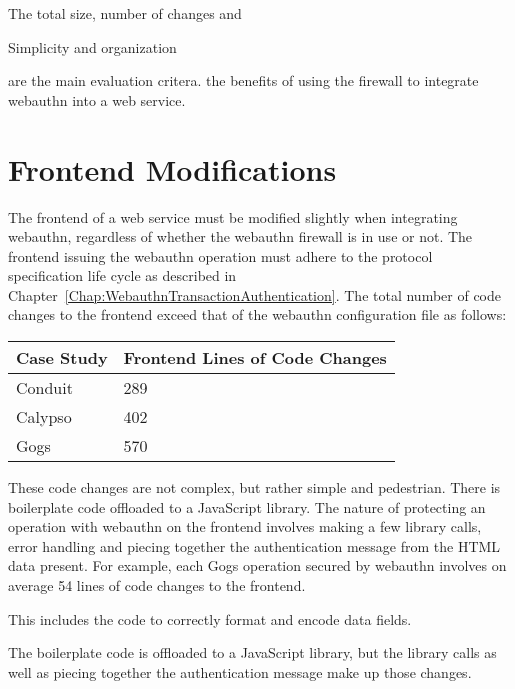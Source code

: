 The total size, number of changes and 

Simplicity and organization

 are the main evaluation critera.
the benefits of using the firewall to integrate webauthn into a web service. 
\fi

\section{Frontend Modifications}

The frontend of a web service must be modified slightly when integrating webauthn, regardless of whether the webauthn firewall is in use or not. The frontend issuing the webauthn operation must adhere to the protocol specification life cycle as described in Chapter~\ref{Chap:WebauthnTransactionAuthentication}. The total number of code changes to the frontend exceed that of the webauthn configuration file as follows:

\begin{table}[h]
\centering

\begin{tabular}{ m{4.5cm} m{6cm}  } 
 \hline
 Case Study & Frontend Lines of Code Changes \\ 
 \hline \hline

 Conduit & 289 \\ \hline

 Calypso & 402 \\ \hline

 Gogs & 570 \\ \hline

\end{tabular}
\end{table}

These code changes are not complex, but rather simple and pedestrian. There is boilerplate code offloaded to a JavaScript library. The nature of protecting an operation with webauthn on the frontend involves making a few library calls, error handling and piecing together the authentication message from the HTML data present. For example, each Gogs operation secured by webauthn involves on average 54 lines of code changes to the frontend. 

\iffalse
This includes the code to correctly format and encode data fields.

The boilerplate code is offloaded to a JavaScript library, but the library calls as well as piecing together the authentication message make up those changes.

